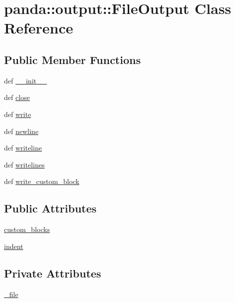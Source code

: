 \hypertarget{classpanda_1_1output_1_1FileOutput}{
\section{panda::output::FileOutput Class Reference}
\label{classpanda_1_1output_1_1FileOutput}
}
\subsection*{Public Member Functions}
\begin{DoxyCompactItemize}
\item 
def \hyperlink{classpanda_1_1output_1_1FileOutput_a2f1decc6bb966da75d2d43a1dccf2056}{\_\-\_\-init\_\-\_\-}
\item 
def \hyperlink{classpanda_1_1output_1_1FileOutput_a0834ae21cba566b60d8e642a18a22aea}{close}
\item 
def \hyperlink{classpanda_1_1output_1_1FileOutput_ad5e62836f30b0d232e5ce5e7afc8a82c}{write}
\item 
def \hyperlink{classpanda_1_1output_1_1FileOutput_ae52305e0db6d0b877d1b714a5273925e}{newline}
\item 
def \hyperlink{classpanda_1_1output_1_1FileOutput_a00ecf28f1f063ea4d86f567e0e972140}{writeline}
\item 
def \hyperlink{classpanda_1_1output_1_1FileOutput_afb1fa8ac2ea75e019c60ea695419bc8a}{writelines}
\item 
def \hyperlink{classpanda_1_1output_1_1FileOutput_a2c4b2e7a79be29764ba9fadf21270b46}{write\_\-custom\_\-block}
\end{DoxyCompactItemize}
\subsection*{Public Attributes}
\begin{DoxyCompactItemize}
\item 
\hyperlink{classpanda_1_1output_1_1FileOutput_a7a9b1d5296a5834e2e8661ebdbeb2530}{custom\_\-blocks}
\item 
\hyperlink{classpanda_1_1output_1_1FileOutput_aa46d6950b0cbba097fdb4bce1e8d4623}{indent}
\end{DoxyCompactItemize}
\subsection*{Private Attributes}
\begin{DoxyCompactItemize}
\item 
\hyperlink{classpanda_1_1output_1_1FileOutput_a3f69760ce924551983fe226b06007251}{\_\-file}
\end{DoxyCompactItemize}


